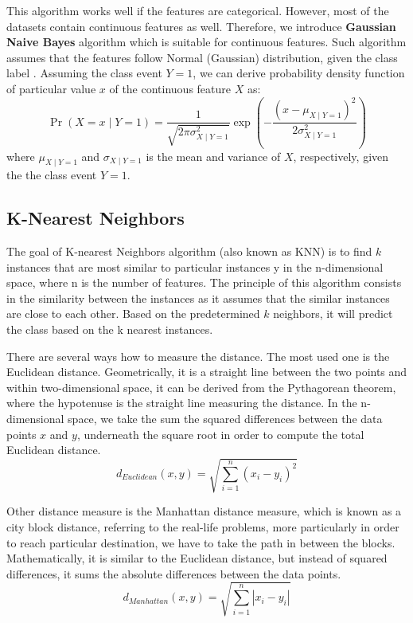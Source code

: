 This algorithm works well if the features are categorical.
However, most of the datasets contain continuous features as well.
Therefore, we introduce \textbf{Gaussian Naive Bayes} algorithm which is suitable for continuous features. Such algorithm assumes that the features follow Normal (Gaussian) distribution, given the class label \citep{jahromi2017non}.
Assuming the class event $Y=1$, we can derive probability density function of particular value $x$ of the continuous feature $X$ as:
\begin{equation}
    \operatorname{Pr}\left(X = x \mid Y = 1\right) = \frac{1}{\sqrt{2 \pi \sigma_{X \mid Y=1}^{2}}} \exp \left(-\frac{\left(x - \mu_{X \mid Y=1}\right)^{2}}{2 \sigma_{X \mid Y=1}^{2}}\right)
\end{equation}
where $\mu_{X \mid Y=1}$ and $\sigma_{X \mid Y=1}$ is the mean and variance of $X$, respectively, given the the class event $Y=1$.
\subsection{K-Nearest Neighbors}
\label{subsec:knn-theory}

The goal of K-nearest Neighbors algorithm (also known as KNN) is to find $k$ instances that are most similar to particular instances y in the n-dimensional space, where n is the number of features.
The principle of this algorithm consists in the similarity between the instances as it assumes that the similar instances are close to each other.
Based on the predetermined $k$ neighbors, it will predict the class based on the k nearest instances.


There are several ways how to measure the distance. The most used one is the Euclidean distance. Geometrically, it is a straight line between the two points  and within two-dimensional space, it can be derived from the Pythagorean theorem, where the hypotenuse is the straight line measuring the distance. In the n-dimensional space, we take the sum the squared differences between the data points $x$ and $y$, underneath the square root in order to compute the total Euclidean distance.
\begin{equation}\label{eq}
d_{Euclidean}(x,y) = \sqrt{\sum\limits_{i=1}^{n} (x_i - y_i)^2}
\end{equation}

Other distance measure is the Manhattan distance measure, which is known as a city block distance, referring to the real-life problems, more particularly in order to reach particular destination, we have to take the path in between the blocks.
Mathematically, it is similar to the Euclidean distance, but instead of squared differences, it sums the absolute differences between the data points.
\begin{equation}\label{eq}
d_{Manhattan}(x,y) = \sqrt{\sum\limits_{i=1}^{n} |x_i - y_i|}
\end{equation}

